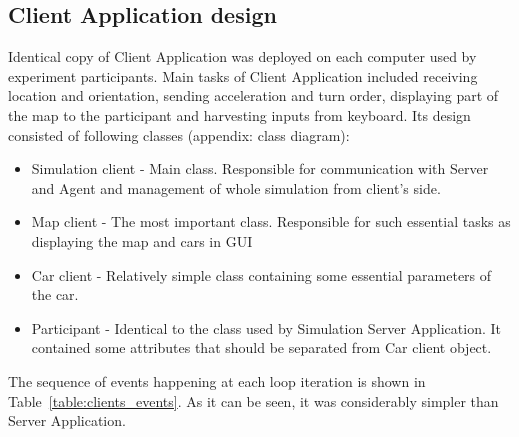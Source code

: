\documentclass[11pt,english]{article}
\begin{document}
\subsection{Client Application design}


Identical copy of Client Application was deployed on  each computer used by experiment participants. Main tasks of Client Application included receiving location and orientation, sending acceleration and turn order, displaying part of the map to the participant and harvesting inputs from keyboard. Its design consisted of following classes (appendix: class diagram):

\begin{itemize}
\item Simulation client - Main class. Responsible for communication with Server and Agent and management of whole simulation from client's side. 
\item Map client - The most important class. Responsible for such essential tasks as displaying the map and cars in GUI
\item Car client - Relatively simple class containing some essential parameters of the car. 
\item Participant - Identical to the class used by Simulation Server Application. It contained some attributes that should be separated from Car client object.
\end{itemize}


The sequence of events happening at each loop iteration is shown in Table~\ref{table:clients_events}. As it can be seen, it was considerably simpler than Server Application. 
\end{document}

